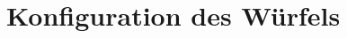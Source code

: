 \documentclass[12pt,a4paper, usenames, dvipsnames]{article}
\theoremstyle{mystyle}
\newtheorem{definition}{Definition}
\theoremstyle{definition}
\newtheorem{bsp}{Beispiel}[definition]
\begin{document}

%
%
%
%
%
%
%
%
%




%
%
%
%
%
%
%
%
%
%
\newpage

\section{Konfiguration des Würfels}
\end{document}

